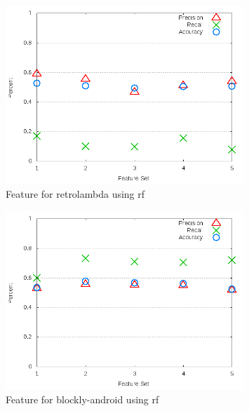 \begin{figure}[!t]
\centering
\includegraphics[width=0.8\textwidth]{images/rf/test_3/retrolambda_sample_range.png}
\caption{Feature for retrolambda using \gls{rf}}
\label{fig:test_3_retrolambda_rf}
\end{figure}

\begin{figure}[!t]
\centering
\includegraphics[width=0.8\textwidth]{images/rf/test_3/blockly-android_sample_range.png}
\caption{Feature for blockly-android using \gls{rf}}
\label{fig:test_3_blockly-android_rf}
\end{figure}

